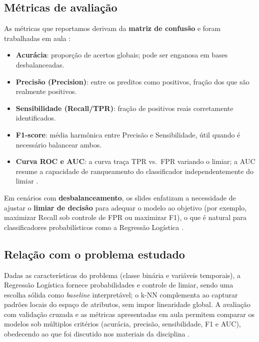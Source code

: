 \documentclass[12pt,oneside]{abntex2}
\begin{document}
\subsection*{Métricas de avaliação}
As métricas que reportamos derivam da \textbf{matriz de confusão} e foram trabalhadas em aula \cite{naozuka_metricas_2025}:
\begin{itemize}
  \item \textbf{Acurácia}: proporção de acertos globais; pode ser enganosa em bases desbalanceadas.
  \item \textbf{Precisão (Precision)}: entre os preditos como positivos, fração dos que são realmente positivos.
  \item \textbf{Sensibilidade (Recall/TPR)}: fração de positivos reais corretamente identificados.
  \item \textbf{F1-score}: média harmônica entre Precisão e Sensibilidade, útil quando é necessário balancear ambos.
  \item \textbf{Curva ROC e AUC}: a curva traça TPR vs.\ FPR variando o limiar; a AUC resume a capacidade de ranqueamento do classificador independentemente do limiar \cite{naozuka_metricas_2025}.
\end{itemize}

Em cenários com \textbf{desbalanceamento}, os slides enfatizam a necessidade de ajustar o \textbf{limiar de decisão} para adequar o modelo ao objetivo (por exemplo, maximizar Recall sob controle de FPR ou maximizar F1), o que é natural para classificadores probabilísticos como a Regressão Logística \cite{naozuka_logistica_2025,naozuka_metricas_2025}.

\subsection*{Relação com o problema estudado}
Dadas as características do problema (classe binária e variáveis temporais), a Regressão Logística fornece probabilidades e controle
de limiar, sendo uma escolha sólida como \emph{baseline} interpretável; o k-NN complementa ao capturar padrões locais do espaço de atributos,
sem impor linearidade global. A avaliação com validação cruzada e as métricas apresentadas em aula permitem comparar os modelos sob múltiplos
critérios (acurácia, precisão, sensibilidade, F1 e AUC), obedecendo ao que foi discutido nos materiais da disciplina
\cite{naozuka_logistica_2025,naozuka_knn_2025,naozuka_metricas_2025}.


\end{document}
